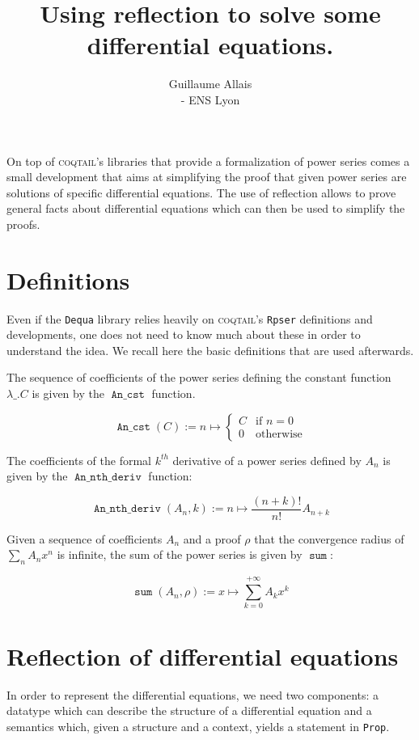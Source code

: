 \documentclass{article}
\title{Using reflection to solve some differential equations.}
\author{Guillaume Allais\\
\coqtail{} - ENS Lyon}
\newcommand{\Prop}{\texttt{Prop}}
\newcommand{\coqtail}{\textsc{coqtail}}
\newcommand{\dequa}{\texttt{Dequa}}
\newcommand{\Rpser}{\texttt{Rpser}}
\DeclareMathOperator{\Psum}{\mathtt{sum}}
\DeclareMathOperator{\C}{\mathtt{An\_cst}}
\DeclareMathOperator{\Dn}{\mathtt{An\_nth\_deriv}}
\begin{document}
\maketitle{}

On top of \coqtail{}'s libraries that provide a formalization of power series
comes a small development that aims at simplifying the proof that given power
series are solutions of specific differential equations. The use of reflection
allows to prove general facts about differential equations which can then be
used to simplify the proofs.

\section{Definitions}

Even if the \dequa{} library relies heavily on \coqtail{}'s \Rpser{} definitions
and developments, one does not need to know much about these in order to
understand the idea.
We recall here the basic definitions that are used afterwards.

The sequence of coefficients of the power series defining the constant function
$\lambda\_. C$ is given by the $\C{}$ function.

$$\C{}(C) := n \mapsto \left\lbrace
\begin{array}{ll}
C & \text{if } n = 0\\
0 & \text{otherwise}
\end{array}
\right.$$

The coefficients of the formal $k^{th}$ derivative of a power series defined by
$A_n$ is given by the $\Dn{}$ function:

$$\Dn{}(A_n, k) := n \mapsto \frac{(n + k)!}{n!}A_{n+k}$$

Given a sequence of coefficients $A_n$ and a proof $\rho$ that the convergence
radius of $\sum_n A_n x^n$ is infinite, the sum of the power series is given by
$\Psum{}$:

$$\Psum{}(A_n, \rho) := x \mapsto \sum_{k=0}^{+ \infty} A_k x^k$$

\section{Reflection of differential equations}

In order to represent the differential equations, we need two components: a
datatype which can describe the structure of a differential equation and a
semantics which, given a structure and a context, yields a statement in
\Prop{}.
\end{document}

